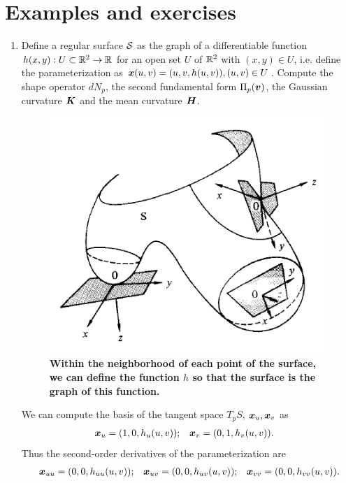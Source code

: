 \documentclass[11pt]{article}
\begin{document}
\section{Examples and exercises}
\begin{enumerate}
\item
\begin{example}
Define a regular surface ${\mathcal S}$ as the graph of a differentiable function $h(x,y): U \subset {\mathbb R}^{2} \rightarrow {\mathbb R}$ for an open set $U$ of ${\mathbb R}^{2}$ with $(x,y)\in U$, i.e. define the parameterization as $\boldsymbol{x}(u,v) = (u,v, h(u,v)), (u,v)\in U$. Compute the shape operator $dN_{p}$, the second fundamental form $\Pi_{p}(\boldsymbol{v})$, the Gaussian curvature $\boldsymbol{K}$ and the mean curvature $\boldsymbol{H}$.
\end{example}
\begin{figure}[thb]
\centering
\begin{minipage}{0.5\linewidth}
 \centerline{\includegraphics[scale = 0.5]{hessian_fund.png}}
\end{minipage}
\caption{\scriptsize
\textbf{Within the neighborhood of each point of the surface, we can define the function $h$ so that the surface is the graph of this function.}}
\end{figure}
\begin{solution}
We can compute the basis of the tangent space $T_{p}S$, $\boldsymbol{x}_{u}, \boldsymbol{x}_{v}$ as
\begin{align*}
\boldsymbol{x}_{u} &= (1, 0, h_{u}(u,v)); & \boldsymbol{x}_{v} &= (0, 1, h_{v}(u,v)).
\end{align*}
Thus the second-order derivatives of the parameterization are 
\begin{align*}
\boldsymbol{x}_{uu} = (0,0, h_{uu}(u,v)); && \boldsymbol{x}_{uv} = (0,0, h_{uv}(u,v)); && \boldsymbol{x}_{vv} = (0,0, h_{vv}(u,v)).
\end{align*}


\end{solution}
\end{enumerate}
\end{document}
